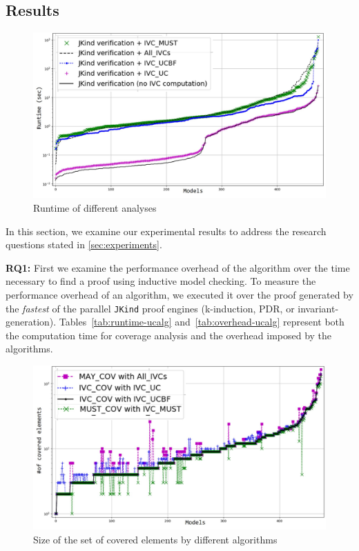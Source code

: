 \subsection{Results}
\label{sec:results}

\newcommand{\takeaway}[1]{
\vspace{6pt}
\noindent\fbox{\parbox{0.98\columnwidth}{#1}}
\vspace{6pt}
}

\begin{figure}
  \centering
  \includegraphics[width=\columnwidth]{figs/timing_analyses_all_sorted.jpg}
  \vspace{-0.1in}
  \caption{Runtime of different analyses}\label{fig:runtimeall}
\end{figure}


In this section, we examine our experimental results to address the research questions stated in \ref{sec:experiments}.

\textbf{RQ1:} First we examine the performance overhead of the \ucalg algorithm over the time necessary to find a proof using inductive model checking. To measure the performance overhead of an algorithm, we executed it over the proof generated by the {\em fastest} of the parallel \texttt{JKind} proof engines (k-induction, PDR, or invariant-generation). Tables~\ref{tab:runtime-ucalg}
and~\ref{tab:overhead-ucalg} represent both the
computation time for coverage analysis
and the overhead imposed by the algorithms.

\begin{figure}
  \centering
  \includegraphics[width=\columnwidth]{figs/size.jpg}
  \vspace{-0.1in}
  \caption{Size of the set of covered elements by different algorithms}\label{fig:size}
\end{figure}

